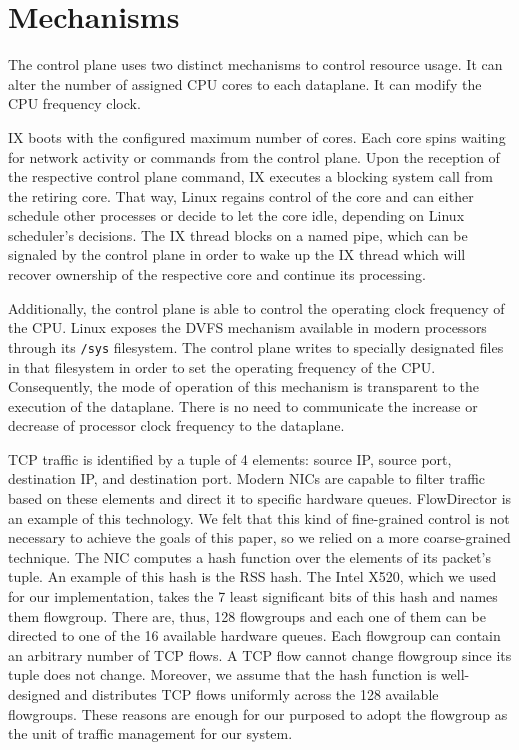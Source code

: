 \section{Mechanisms}

The control plane uses two distinct mechanisms to control resource usage.
It can alter the number of assigned CPU cores to each dataplane.
It can modify the CPU frequency clock.

IX boots with the configured maximum number of cores.
Each core spins waiting for network activity or commands from the control plane.
Upon the reception of the respective control plane command, IX executes a blocking system call from the retiring core.
That way, Linux regains control of the core and can either schedule other processes or decide to let the core idle, depending on Linux scheduler's decisions.
The IX thread blocks on a named pipe, which can be signaled by the control plane in order to wake up the IX thread which will recover ownership of the respective core and continue its processing.

Additionally, the control plane is able to control the operating clock frequency of the CPU.
Linux exposes the DVFS mechanism available in modern processors through its \texttt{/sys} filesystem.
The control plane writes to specially designated files in that filesystem in order to set the operating frequency of the CPU.
Consequently, the mode of operation of this mechanism is transparent to the execution of the dataplane.
There is no need to communicate the increase or decrease of processor clock frequency to the dataplane.

TCP traffic is identified by a tuple of 4 elements: source IP, source port, destination IP, and destination port.
Modern NICs are capable to filter traffic based on these elements and direct it to specific hardware queues.
FlowDirector is an example of this technology.
We felt that this kind of fine-grained control is not necessary to achieve the goals of this paper, so we relied on a more coarse-grained technique.
The NIC computes a hash function over the elements of its packet's tuple.
An example of this hash is the RSS hash.
The Intel X520, which we used for our implementation, takes the 7 least significant bits of this hash and names them flowgroup.
There are, thus, 128 flowgroups and each one of them can be directed to one of the 16 available hardware queues.
Each flowgroup can contain an arbitrary number of TCP flows.
A TCP flow cannot change flowgroup since its tuple does not change.
Moreover, we assume that the hash function is well-designed and distributes TCP flows uniformly across the 128 available flowgroups.
These reasons are enough for our purposed to adopt the flowgroup as the unit of traffic management for our system.

